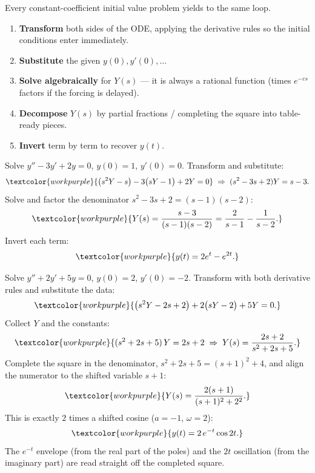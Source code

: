 Every constant-coefficient initial value problem yields to the same loop.

\begin{methodbox}
\begin{enumerate}
    \item \textbf{Transform} both sides of the ODE, applying the derivative rules so
          the initial conditions enter immediately.
    \item \textbf{Substitute} the given $y(0), y'(0), \dots$
    \item \textbf{Solve algebraically} for $Y(s)$ --- it is always a rational
          function (times $e^{-cs}$ factors if the forcing is delayed).
    \item \textbf{Decompose} $Y(s)$ by partial fractions / completing the square into
          table-ready pieces.
    \item \textbf{Invert} term by term to recover $y(t)$.
\end{enumerate}
\end{methodbox}

\begin{examplebox}
Solve $y'' - 3y' + 2y = 0$, $y(0)=1$, $y'(0)=0$. Transform and substitute:
\[ \textcolor{workpurple}{\big(s^2 Y - s\big) - 3\big(sY - 1\big) + 2Y = 0}
   \;\Rightarrow\; (s^2-3s+2)Y = s-3. \]
Solve and factor the denominator $s^2-3s+2=(s-1)(s-2)$:
\[ \textcolor{workpurple}{Y(s) = \frac{s-3}{(s-1)(s-2)}
   = \frac{2}{s-1} - \frac{1}{s-2}.} \]
Invert each term:
\[ \textcolor{workpurple}{y(t) = 2e^{t} - e^{2t}.} \]
\end{examplebox}

\begin{examplebox}
Solve $y'' + 2y' + 5y = 0$, $y(0)=2$, $y'(0)=-2$. Transform with both derivative
rules and substitute the data:
\[ \textcolor{workpurple}{\big(s^2 Y - 2s + 2\big) + 2\big(sY - 2\big) + 5Y = 0.} \]
Collect $Y$ and the constants:
\[ \textcolor{workpurple}{(s^2 + 2s + 5)\,Y = 2s + 2
   \;\Rightarrow\; Y(s) = \frac{2s + 2}{s^2 + 2s + 5}.} \]
Complete the square in the denominator, $s^2+2s+5 = (s+1)^2 + 4$, and align the
numerator to the shifted variable $s+1$:
\[ \textcolor{workpurple}{Y(s) = \frac{2(s+1)}{(s+1)^2 + 2^2}.} \]
This is exactly $2$ times a shifted cosine ($a=-1$, $\omega=2$):
\[ \textcolor{workpurple}{y(t) = 2\,e^{-t}\cos 2t.} \]
The $e^{-t}$ envelope (from the real part of the poles) and the $2t$ oscillation
(from the imaginary part) are read straight off the completed square.
\end{examplebox}

